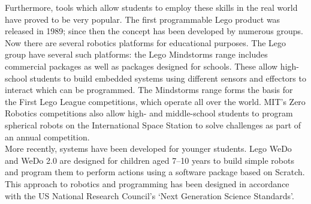     Furthermore, tools which allow students to employ these skills in the real world have proved to be very popular. The first programmable Lego product was released in 1989; since then the concept has been developed by numerous groups. Now there are several robotics platforms for educational purposes. The Lego group have several such platforms: the Lego Mindstorms range includes commercial packages as well as packages designed for schools. These allow high-school students to build embedded systems using different sensors and effectors to interact which can be programmed. The Mindstorms range forms the basis for the First Lego League competitions, which operate all over the world. MIT's Zero Robotics competitions also allow high- and middle-school students to program spherical robots on the International Space Station to solve challenges as part of an annual competition.\cite{zerorobotics}\\
    More recently, systems have been developed for younger students. Lego WeDo and WeDo 2.0 are designed for children aged 7--10 years to build simple robots and program them to perform actions using a software package based on Scratch.\cite{wedo2} This approach to robotics and programming has been designed in accordance with the US National Research Council's `Next Generation Science Standards'.

